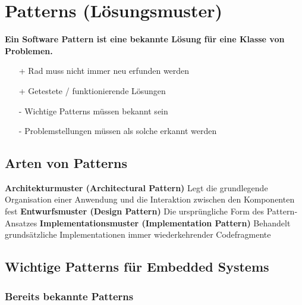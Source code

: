 \section{Patterns (Lösungsmuster)}

\textbf{Ein Software Pattern ist eine bekannte Lösung für eine Klasse von Problemen.}

\vspace{0.1cm}

\begin{minipage}[t]{0.48\columnwidth}
    \raggedright

    \begin{itemize}
        \item[+] Rad muss nicht immer neu erfunden werden 
        \item[+] Getestete / funktionierende Lösungen 
    \end{itemize}
\end{minipage}
\hfill
\begin{minipage}[t]{0.48\columnwidth}
    \raggedright

    \begin{itemize}
        \item[-] Wichtige Patterns müssen bekannt sein
        \item[-] Problemstellungen müssen als solche erkannt werden 
    \end{itemize}
\end{minipage}


\subsection{Arten von Patterns}

\begin{outline}
    \1 \textbf{Architekturmuster (Architectural Pattern)}
        \2 Legt die grundlegende Organisation einer Anwendung und die Interaktion zwischen den Komponenten fest
    \1 \textbf{Entwurfsmuster (Design Pattern)}
        \2 Die ursprüngliche Form des Pattern‐Ansatzes
    \1 \textbf{Implementationsmuster (Implementation Pattern)}
        \2 Behandelt grundsätzliche Implementationen immer wiederkehrender Codefragmente
\end{outline}


\subsection{Wichtige Patterns für Embedded Systems}

\subsubsection{Bereits bekannte Patterns}

